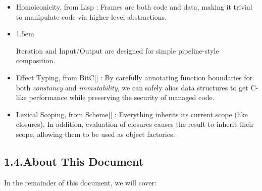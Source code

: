 \documentclass[preprint]{{acmart}}
\begin{document}
\begin{itemize}[noitemsep,topsep=\mdcompacttopsep]%

\item{}Homoiconicity, from Lisp : Frames are both code and data, making it
trivial to manipulate code via higher-level abstractions.%

\item{}
\begin{mddefinitions}%


\begin{mdbmarginx}{}{}{}{1.5em}%
\begin{mddefdata}%
Iteration and Input/Output are designed for simple pipeline-style composition.%
\end{mddefdata}%
\end{mdbmarginx}%
\end{mddefinitions}%

\item{}Effect Typing, from BitC[] : By carefully annotating function
boundaries for both \emph{constancy} and \emph{immutability}, we can safely alias
data structures to get C-like performance while preserving the security
of managed code.%

\item{}Lexical Scoping, from Scheme[] : Everything inherits its current
scope (like closures). In addition, evaluation of closures causes the
result to inherit their scope, allowing them to be used as object
factories.%
\end{itemize}%

\subsection{1.4.\hspace*{0.5em}About This Document}\label{sec-about-this-document}%

\noindent{}In the remainder of this document, we will cover:%
\end{document}
